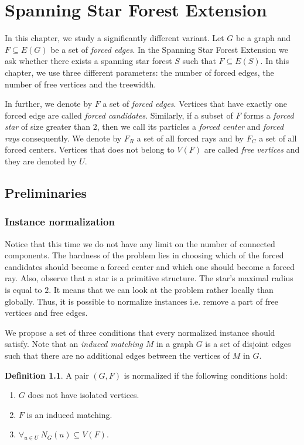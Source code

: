 \documentclass[en]{pracamgr}
\theoremstyle{definition}
\newtheorem{definition}{Definition}
\newcommand{\ssf}{spanning star forest}
\newcommand{\ssfep}{{\sc Spanning Star Forest Extension}}
\begin{document}
\chapter{Spanning Star Forest Extension}

In this chapter, we study a significantly different variant. Let $G$ be a graph and $F \subseteq E(G)$ be a set of \emph{forced edges}. In the \ssfep{} we ask whether there exists a \ssf{} $S$ such that $F \subseteq E(S)$. In this chapter, we use three different parameters: the number of forced edges, the number of free vertices and the treewidth. 

In further, we denote by $F$ a set of \emph{forced edges}. Vertices that have exactly one forced edge are called \emph{forced candidates}. Similarly, if a subset of $F$ forms a \emph{forced star} of size greater than $2$, then we call its particles a \emph{forced center} and \emph{forced rays} consequently. We denote by $F_R$ a set of all forced rays and by $F_C$ a set of all forced centers. Vertices that does not belong to $V(F)$ are called \emph{free vertices} and they are denoted by $U$.

\section{Preliminaries}

\subsection{Instance normalization} 

Notice that this time we do not have any limit on the number of connected components. The hardness of the problem lies in choosing which of the forced candidates should become a forced center and which one should become a forced ray. Also, observe that a star is a primitive structure. The star's maximal radius is equal to $2$. It means that we can look at the problem rather locally than globally. Thus, it is possible to normalize instances i.e. remove a part of free vertices and free edges.

We propose a set of three conditions that every normalized instance should satisfy. Note that an \emph{induced matching} $M$ in a graph $G$ is a set of disjoint edges such that there are no additional edges between the vertices of $M$ in $G$.

\begin{definition}\label{norm-ssfe}
	A pair $(G,F)$ is normalized if the following conditions hold:
	\begin{enumerate}
		\item $G$ does not have isolated vertices.
		\item $F$ is an induced matching.
		\item $\forall_{u \in U}\ N_G(u) \subseteq V(F)$.
	\end{enumerate}
\end{definition}
\end{document}
